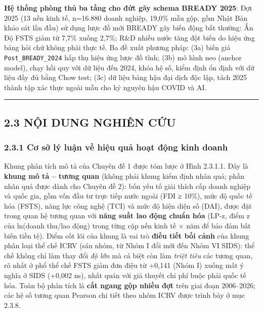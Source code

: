 \documentclass[
  a4paper,
  13pt]{extreport}
\begin{document}
\textbf{Hệ thống phòng thủ ba tầng cho đứt gãy schema BREADY 2025}: Đợt
2025 (13 nền kinh tế, n=16.880 doanh nghiệp, 19,0\% mẫu gộp, gồm Nhật
Bản khảo sát lần đầu) sử dụng lược đồ mới BREADY gây biến động bất
thường: Ấn Độ FSTS giảm từ 7,7\% xuống 2,7\%; R\&D nhiều nước tăng đột
biến do hiệu ứng bảng hỏi chứ không phải thực tế. Ba đề xuất phương
pháp: (3a) biến giả \texttt{Post\_BREADY\_2024} hấp thụ hiệu ứng lược đồ
tĩnh; (3b) mô hình neo (anchor model), chạy hồi quy với dữ liệu đến
2024, khóa hệ số, kiểm định ổn định với dữ liệu đầy đủ bằng Chow test;
(3c) dữ liệu bảng hậu đại dịch độc lập, tách 2025 thành tập xác thực
ngoài mẫu cho kỷ nguyên hậu COVID và AI.

\begin{center}\rule{0.5\linewidth}{0.5pt}\end{center}

\hypertarget{nux1ed9i-dung-nghiuxean-cux1ee9u}{%
\subsection{2.3 NỘI DUNG NGHIÊN
CỨU}\label{nux1ed9i-dung-nghiuxean-cux1ee9u}}

\hypertarget{cux1a1-sux1edf-luxfd-luux1eadn-vux1ec1-hiux1ec7u-quux1ea3-houx1ea1t-ux111ux1ed9ng-kinh-doanh}{%
\subsubsection{2.3.1 Cơ sở lý luận về hiệu quả hoạt động kinh
doanh}\label{cux1a1-sux1edf-luxfd-luux1eadn-vux1ec1-hiux1ec7u-quux1ea3-houx1ea1t-ux111ux1ed9ng-kinh-doanh}}

Khung phân tích mô tả của Chuyên đề 1 được tóm lược ở Hình 2.3.1.1. Đây
là \textbf{khung mô tả -- tương quan} (không phải khung kiểm định nhân
quả; phần nhân quả được dành cho Chuyên đề 2): bốn yếu tố giải thích cấp
doanh nghiệp và quốc gia, gồm vốn đầu tư trực tiếp nước ngoài (FDI ≥
10\%), mức độ quốc tế hóa (FSTS), năng lực công nghệ (TCI) và mức độ
hiện diện số (DAI), được đặt trong quan hệ tương quan với \textbf{năng
suất lao động chuẩn hóa} (LP-z, điểm z của ln(doanh thu/lao động) trong
từng cặp nền kinh tế × năm để bảo đảm bất biến tiền tệ). Điểm cốt lõi
của khung là vai trò \textbf{điều tiết bối cảnh} của khung phân loại thể
chế ICRV (sáu nhóm, từ Nhóm I đổi mới đến Nhóm VI SIDS): thể chế không
chỉ làm thay đổi \emph{độ lớn} mà cá biệt còn làm \emph{triệt tiêu} các
tương quan, rõ nhất ở phổ thể chế FSTS giảm đơn điệu từ +0,141 (Nhóm I)
xuống mất ý nghĩa ở SIDS (+0,002 ns), nhất quán với giả thuyết chi phí
buộc phải quốc tế hóa. Toàn bộ phân tích là \textbf{cắt ngang gộp nhiều
đợt} trên giai đoạn 2006--2026; các hệ số tương quan Pearson chi tiết
theo nhóm ICRV được trình bày ở mục 2.3.8.
\end{document}
